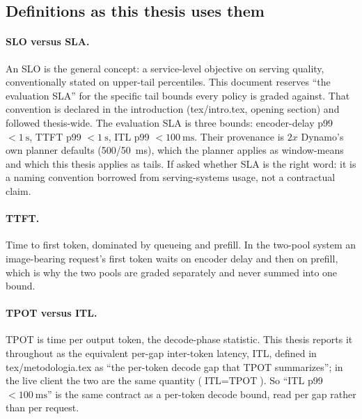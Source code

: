 \documentclass[11pt,a4paper]{article}
\def\times{x}\def\rho{rho}\def\approx{~}\def\leq{<=}\def\geq{>=}%
\def\emph#1{#1}\def\texttt#1{#1}%
\begin{document}
\subsection*{Definitions as this thesis uses them}

\paragraph{SLO versus SLA.} An SLO is the general concept: a service-level
\emph{objective} on serving quality, conventionally stated on upper-tail
percentiles. This document reserves ``the \emph{evaluation} SLA'' for the
specific tail bounds every policy is graded against. That convention is
declared in the introduction (\texttt{tex/intro.tex}, opening section) and
followed thesis-wide. The evaluation SLA is three bounds: encoder-delay p99
$<\SI{1}{\second}$, TTFT p99 $<\SI{1}{\second}$, ITL p99
$<\SI{100}{\milli\second}$. Their provenance is $2\times$ Dynamo's own
planner defaults (\SI{500}{}/\SI{50}{\milli\second}), which the planner
applies as window-\emph{means} and which this thesis applies as \emph{tails}.
If asked whether SLA is the right word: it is a naming convention borrowed
from serving-systems usage, not a contractual claim.

\paragraph{TTFT.} Time to first token, dominated by queueing and prefill. In
the two-pool system an image-bearing request's first token waits on encoder
delay \emph{and} then on prefill, which is why the two pools are graded
separately and never summed into one bound.

\paragraph{TPOT versus ITL.} TPOT is time per output token, the decode-phase
statistic. This thesis reports it throughout as the equivalent per-gap
inter-token latency, ITL, defined in \texttt{tex/metodologia.tex} as ``the
per-token decode gap that TPOT summarizes''; in the live client the two are
the same quantity ($\text{ITL}=\text{TPOT}$). So ``ITL p99
$<\SI{100}{\milli\second}$'' is the same contract as a per-token decode
bound, read per gap rather than per request.
\end{document}

